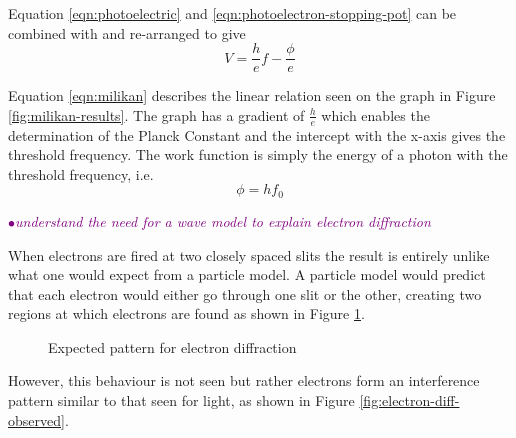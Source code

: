 \documentclass[a4paper,11pt,twoside]{memoir}
\newcounter{spec}[chapter]
\newcommand{\spec}[1]{\Needspace{5\baselineskip}\textcolor{purple}{$\bullet$\hspace{0.5cm}\textit{#1}}}
\begin{document}
Equation \ref{eqn:photoelectric} and \ref{eqn:photoelectron-stopping-pot} can be combined with  and re-arranged to give
\begin{equation}\label{eqn:milikan}
V = \frac{h}{e}f - \frac{\phi}{e}
\end{equation}

Equation \ref{eqn:milikan} describes the linear relation seen on the graph in Figure \ref{fig:milikan-results}. The graph has a gradient of $\frac{h}{e}$ which enables the determination of the Planck Constant and the intercept with the x-axis gives the threshold frequency. The work function is simply the energy of a photon with the threshold frequency, i.e.
\begin{equation}
  \phi = hf_0
\end{equation}

\spec{understand the need for a wave model to explain electron diffraction}

When electrons are fired at two closely spaced slits the result is entirely unlike what one would expect from a particle model. A particle model would predict that each electron would either go through one slit or the other, creating two regions at which electrons are found as shown in Figure \ref{fig:electron-diff-expected}.

\begin{figure}[h]
  \begin{center}
  \end{center}
  \caption{Expected pattern for electron diffraction}
  \label{fig:electron-diff-expected}
\end{figure}


However, this behaviour is not seen but rather electrons form an interference pattern similar to that seen for light, as shown in Figure \ref{fig:electron-diff-observed}.
\end{document}
